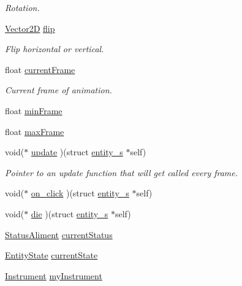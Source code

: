 \begin{DoxyCompactItemize}
\begin{DoxyCompactList}\small\item\em Rotation. \end{DoxyCompactList}\item 
\hyperlink{struct_vector2_d}{Vector2D} \hyperlink{structentity__s_afc50ca9ba71427ea7962929de4b0e1bb}{flip}
\begin{DoxyCompactList}\small\item\em Flip horizontal or vertical. \end{DoxyCompactList}\item 
float \hyperlink{structentity__s_a6c816fc91c0d3b73641b802cc889195d}{current\+Frame}
\begin{DoxyCompactList}\small\item\em Current frame of animation. \end{DoxyCompactList}\item 
float \hyperlink{structentity__s_a01ee90dc9c4db69ef58c8c6d8ba67f28}{min\+Frame}
\item 
float \hyperlink{structentity__s_a0fe584f9e9339b6558acfff9faafe187}{max\+Frame}
\item 
void($\ast$ \hyperlink{structentity__s_ae4dad0223ba78dddff3177bd20960ff2}{update} )(struct \hyperlink{structentity__s}{entity\+\_\+s} $\ast$self)
\begin{DoxyCompactList}\small\item\em Pointer to an update function that will get called every frame. \end{DoxyCompactList}\item 
void($\ast$ \hyperlink{structentity__s_a4585fbbdf8aed52da0855955d1a462ad}{on\+\_\+click} )(struct \hyperlink{structentity__s}{entity\+\_\+s} $\ast$self)
\item 
void($\ast$ \hyperlink{structentity__s_ab7c43f12b245296f839eda999ed25896}{die} )(struct \hyperlink{structentity__s}{entity\+\_\+s} $\ast$self)
\item 
\hyperlink{entity__s_8h_a0d7bb91e8dc77eb36211e30983b47be4}{Status\+Aliment} \hyperlink{structentity__s_ad5a194015ada8926cdf00ff425d04d8a}{current\+Status}
\item 
\hyperlink{entity__s_8h_a7712b41d8b546c939974a1e653651aea}{Entity\+State} \hyperlink{structentity__s_a99fdae70672313aa145567525bb13042}{current\+State}
\item 
\hyperlink{entity__s_8h_a498adc21b55fb917031c541073699945}{Instrument} \hyperlink{structentity__s_ab2c76805fde47894da8bf16f81963db7}{my\+Instrument}
\item 

\end{DoxyCompactItemize}
